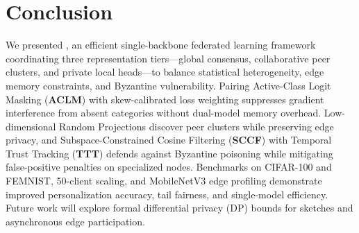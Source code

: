 \section{Conclusion}
\label{sec:conclusion}

We presented \textbf{\fedhep{}}, an efficient single-backbone federated learning framework coordinating three representation tiers---global consensus, collaborative peer clusters, and private local heads---to balance statistical heterogeneity, edge memory constraints, and Byzantine vulnerability. Pairing Active-Class Logit Masking (\textbf{ACLM}) with skew-calibrated loss weighting suppresses gradient interference from absent categories without dual-model memory overhead. Low-dimensional Random Projections discover peer clusters while preserving edge privacy, and Subspace-Constrained Cosine Filtering (\textbf{SCCF}) with Temporal Trust Tracking (\textbf{TTT}) defends against Byzantine poisoning while mitigating false-positive penalties on specialized nodes. Benchmarks on CIFAR-100 and FEMNIST, 50-client scaling, and MobileNetV3 edge profiling demonstrate improved personalization accuracy, tail fairness, and single-model efficiency. Future work will explore formal differential privacy (DP) bounds for sketches and asynchronous edge participation.
